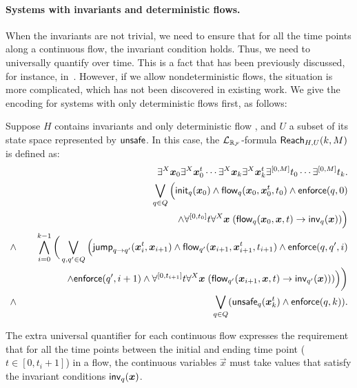 \documentclass[12pt]{llncs}
\newcommand{\enforce}{\mathsf{enforce}}
\begin{document}
\paragraph{Systems with invariants and deterministic flows.} When the invariants are not trivial, we need to ensure that for all the time points along a continuous flow, the invariant condition holds. Thus, we need to universally quantify over time. This is a fact that has been previously discussed, for instance, in~\cite{DBLP:conf/fmcad/CimattiMT12}. However, if we allow nondeterministic flows, the situation is more complicated, which has not been discovered in existing work. We give the encoding for systems with only deterministic flows first, as follows:
\begin{definition}\label{br2}
Suppose $H$ contains invariants and only deterministic flow
, and $U$ a subset of its state space represented by $\mathsf{unsafe}$. In this case, the $\mathcal{L}_{\mathbb{R}_{\mathcal{F}}}$-formula $\mathsf{Reach}_{H,U}(k,M)$ is defined as:
\begin{eqnarray*}
& &\exists^X \vec x_{0} \exists^X\vec x_{0}^t\cdots \exists^X \vec x_{k}\exists^X\vec x_{k}^t \exists^{[0,M]}t_0\cdots \exists^{[0,M]}t_k.\\
& &\bigvee_{q\in Q} \Big(\init_{q}(\vec x_{0})\wedge \flow_{q}(\vec x_{0}, \vec x_{0}^t, t_0)\wedge \enforce(q,0)\\
& &\hspace{5cm} \wedge \forall^{[0,t_0]}t\forall^X\vec x\;(\flow_{q}(\vec x_{0}, \vec x, t)\rightarrow \inv_{q}(\vec x))\Big) \\
\wedge & &\bigwedge_{i=0}^{k-1}\bigg( \bigvee_{q, q'\in Q} \Big(\jump_{q\rightarrow q'}(\vec
x_{i}^t, \vec x_{i+1})\wedge \flow_{q'}(\vec x_{i+1}, \vec x_{i+1}^t, t_{i+1})\wedge \enforce(q,q',i)\\
& & \hspace{1.5cm}\wedge\enforce(q',i+1)\wedge \forall^{[0,t_{i+1}]}t\forall^X\vec x\;(\flow_{q'}(\vec x_{i+1}, \vec x,
t)\rightarrow \inv_{q'}(\vec x)) )\Big)\bigg)\\
\wedge & &\bigvee_{q\in Q} (\unsafe_q(\vec x_{k}^t)\wedge \enforce(q,k)).
\end{eqnarray*}
\end{definition}
The extra universal quantifier for each continuous flow expresses the requirement that for all the time points between the initial and ending time point ($t\in[0,t_i+1]$) in a flow, the continuous variables $\vec x$ must take values that satisfy the invariant conditions $\inv_q(\vec x)$.
\end{document}
